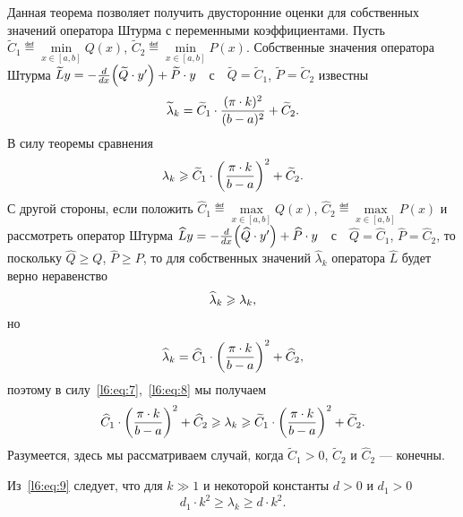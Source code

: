 Данная теорема позволяет получить двусторонние оценки для собственных значений оператора Штурма с переменными коэффициентами. Пусть $\widetilde{C}_1\eqdef\min\limits_{x\in[a,b]}Q(x)$, $\widetilde{C}_2\eqdef\min\limits_{x\in[a,b]}P(x)$. Собственные значения оператора Штурма $\widetilde{L}y=-\frac{d}{dx}\Big(\widetilde{Q}\cdot y'\Big)+\widetilde{P}\cdot y\quad$с$\quad\widetilde{Q}=\widetilde{C}_1$, $\widetilde{P}=\widetilde{C}_2$ известны 
\begin{equation*}
	\hfill\widetilde{\lambda}_k=\widetilde{C}_1\cdot\frac{(\pi\cdot k)^2}{(b-a)^2}+\widetilde{C}_2.\hfill
\end{equation*}
В силу теоремы сравнения
\begin{equation}
	\label{l6:eq:7}
	\hfill\lambda_k\geqslant\widetilde{C}_1\cdot\left(\frac{\pi\cdot k}{b-a}\right)^2+\widetilde{C}_2.\hfill
\end{equation}
С другой стороны, если положить $\widehat{C}_1\eqdef\max\limits_{x\in[a,b]}Q(x)$, $\widehat{C}_2\eqdef\max\limits_{x\in[a,b]}P(x)$ и рассмотреть оператор Штурма $\widehat{L}y=-\frac{d}{dx}\Big(\widehat{Q}\cdot y'\Big)+\widehat{P}\cdot y\quad$с$\quad\widehat{Q}=\widehat{C}_1$, $\widehat{P}=\widehat{C}_2$, то поскольку $\widehat{Q}\geqslant Q$, $\widehat{P}\geqslant P$, то для собственных значений $\widehat{\lambda}_k$ оператора $\widehat{L}$ будет верно неравенство
\begin{equation}
	\label{l6:eq:8}
	\hfill \widehat{\lambda}_k\geqslant\lambda_k,\hfill
\end{equation}
но 
\begin{equation*}
	\hfill\widehat{\lambda}_k=\widehat{C}_1\cdot \left(\frac{\pi\cdot k}{b-a}\right)^2+\widehat{C}_2,\hfill
\end{equation*}
поэтому в силу~\eqref{l6:eq:7},~\eqref{l6:eq:8} мы получаем
\begin{equation}
	\label{l6:eq:9}
	\hfill\widehat{C}_1\cdot\left(\frac{\pi\cdot k}{b-a}\right)^2+\widehat{C}_2\geqslant\lambda_k\geqslant\widetilde{C}_1\cdot\left(\frac{\pi\cdot k}{b-a}\right)^2+\widetilde{C}_2.\hfill
\end{equation}
Разумеется, здесь мы рассматриваем случай, когда $\widetilde{C}_1>0$, $\widetilde{C}_2$ и $\widehat{C}_2$ --- конечны. 

Из~\eqref{l6:eq:9} следует, что для $k\gg1$ и некоторой константы $d>0$ и $d_1>0$  
\begin{equation}
	\label{l6:eq:10}
	d_1\cdot k^2\geqslant\lambda_k\geqslant d\cdot k^2.
\end{equation} 
